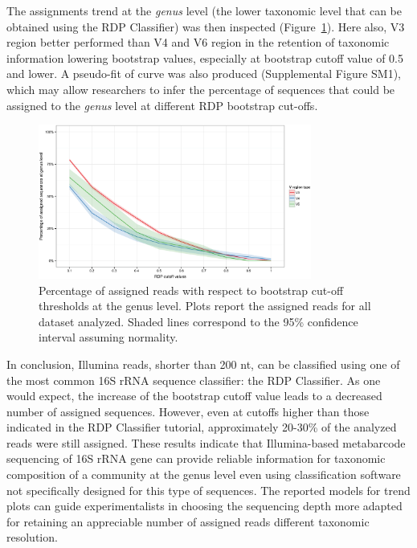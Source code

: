 The assignments trend at the \textit{genus} level (the lower taxonomic level that can be obtained using the RDP Classifier) was then inspected (Figure~\ref{fig:2rdp}).  Here also, V3 region better performed than V4 and V6 region in the retention of taxonomic information lowering bootstrap values, especially at bootstrap cutoff value of 0.5 and lower. A pseudo-fit of curve was also produced (Supplemental Figure SM1), which may allow researchers to infer the percentage of sequences that could be assigned to the \textit{genus} level at different RDP bootstrap cut-offs.\\%
\begin{figure}[!tb]
	\centering
	\includegraphics[width=0.8\textwidth]{./figures/Chapter_2/Figure_2}
  	\caption{\label{fig:2rdp}Percentage of assigned reads with respect to bootstrap cut-off thresholds at the genus level. Plots report the assigned reads for all dataset analyzed. Shaded lines correspond to the 95\% confidence interval assuming normality.}
\end{figure}%
In conclusion, Illumina reads, shorter than 200 nt, can be classified using one of the most common 16S rRNA sequence classifier: the RDP Classifier. As one would expect, the increase of the bootstrap cutoff value leads to a decreased number of assigned sequences. However, even at cutoffs higher than those indicated in the RDP Classifier tutorial, approximately 20-30\% of the analyzed reads were still assigned. These results indicate that Illumina-based metabarcode sequencing of 16S rRNA gene can provide reliable information for taxonomic composition of a community at the genus level even using classification software not specifically designed for this type of sequences. The reported models for trend plots can guide experimentalists in choosing the sequencing depth more adapted for retaining an appreciable number of assigned reads different taxonomic resolution.\\

